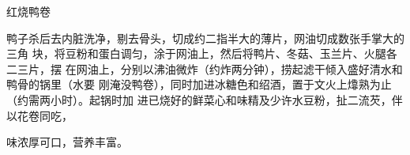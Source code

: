 %
%
%
%
%
%
%
\begin{recipe}{红烧鸭卷}

\ingredients


\preparation

鸭子杀后去内脏洗净，剔去骨头，切成约二指半大的薄片，网油切成数张手掌大的三角
块，将豆粉和蛋白调匀，涂于网油上，然后将鸭片、冬菇、玉兰片、火腿各二三片，摆
在网油上，分别以沸油微炸（约炸两分钟），捞起滤干倾入盛好清水和鸭骨的锅里（水要
刚淹没鸭卷），同时加进冰糖色和绍酒，置于文火上㸆熟为止（约需两小时）。起锅时加
进已烧好的鲜菜心和味精及少许水豆粉，扯二流芡，伴以花卷同吃，

\features

味浓厚可口，营养丰富。

\end{recipe}

